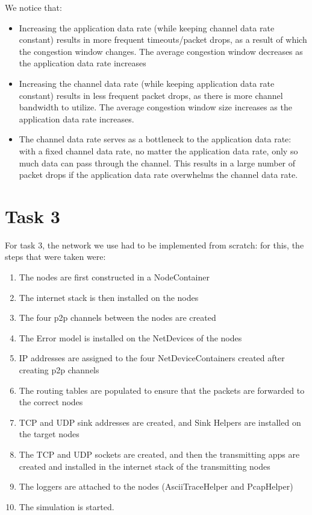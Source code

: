 \documentclass[12pt]{article}
\begin{document}
We notice that:
\begin{itemize}
    \item Increasing the application data rate (while keeping channel data rate 
    constant) results in more frequent timeouts/packet drops, as a result of 
    which the congestion window changes. The average congestion window decreases  
    as the application data rate increases
    \item Increasing the channel data rate (while keeping application data rate 
    constant) results in less frequent packet drops, as there is more channel 
    bandwidth to utilize. The average congestion window size increases as the 
    application data rate increases.
    \item The channel data rate serves as a bottleneck to the application data 
    rate: with a fixed channel data rate, no matter the application data rate, 
    only so much data can pass through the channel. This results in a large 
    number of packet drops if the application data rate overwhelms the channel 
    data rate.
\end{itemize}

\clearpage

\section*{Task 3}

For task 3, the network we use had to be implemented from scratch: for this, the 
steps that were taken were:
\begin{enumerate}
\item The nodes are first constructed in a NodeContainer
\item The internet stack is then installed on the nodes
\item The four p2p channels between the nodes are created
\item The Error model is installed on the NetDevices of the nodes
\item IP addresses are assigned to the four NetDeviceContainers created after 
      creating p2p channels
\item The routing tables are populated to ensure that the packets are forwarded 
      to the correct nodes
\item TCP and UDP sink addresses are created, and Sink Helpers are installed on 
      the target nodes 
\item The TCP and UDP sockets are created, and then the transmitting apps are 
      created and installed in the internet stack of the transmitting nodes 
\item The loggers are attached to the nodes (AsciiTraceHelper and PcapHelper)
\item The simulation is started.
\end{enumerate}
\end{document}
